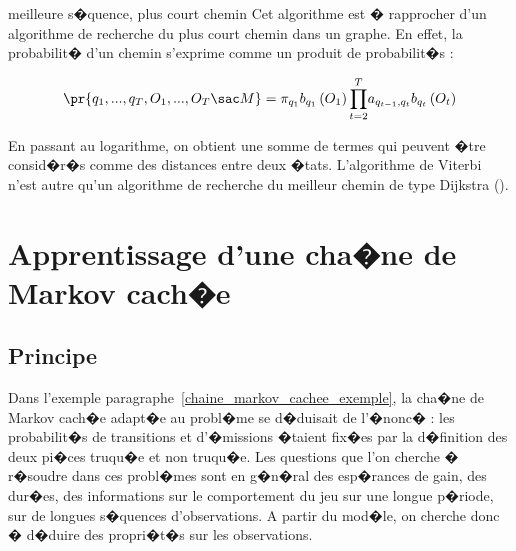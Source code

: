 \begin{xremark}{meilleure s�quence, plus court chemin}
Cet algorithme est � rapprocher d'un algorithme de recherche du plus court chemin dans un graphe. En effet, la probabilit� d'un chemin s'exprime comme un produit de probabilit�s :%



        $$
        \pr {  q_{1},...,q_{T},O_{1},...,O_{T} \sac  M}  =\pi_{q_{1}}b_{q_{1}}
                \left(  O_{1}\right)  \underset{t=2}{\overset{T}{\prod}
        }a_{q_{t-1},q_{t}}b_{q_{t}}\left(  O_{t}\right)
        $$

En passant au logarithme, on obtient une somme de termes qui peuvent �tre consid�r�s comme des distances entre deux �tats. L'algorithme de Viterbi n'est autre qu'un algorithme de recherche du meilleur chemin de type Dijkstra ().
\end{xremark}















\section{Apprentissage d'une cha�ne de Markov cach�e}
\label{hmm_apprentissage_chapter}

\subsection{Principe}

%
\label{par_apprentissage_hmm}

Dans l'exemple paragraphe~\ref{chaine_markov_cachee_exemple}, la cha�ne de Markov cach�e adapt�e au probl�me se d�duisait de l'�nonc� : les probabilit�s de transitions et d'�missions �taient fix�es par la d�finition des deux pi�ces truqu�e et non truqu�e. Les questions que l'on cherche � r�soudre dans ces probl�mes sont en g�n�ral des esp�rances de gain, des dur�es, des informations sur le comportement du jeu sur une longue p�riode, sur de longues s�quences d'observations. A partir du mod�le, on cherche donc � d�duire des propri�t�s sur les observations. 

